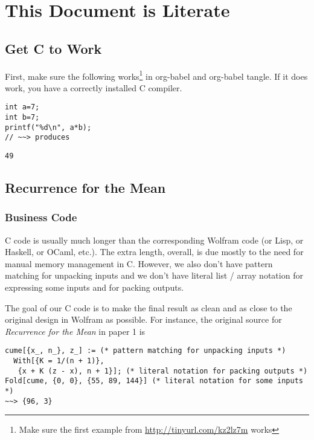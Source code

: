 \documentclass[10pt,oneside,x11names]{article}
\begin{document}
\section{This Document is Literate}
\label{sec:orgheadline15}

\subsection{Get C to Work}
\label{sec:orgheadline3}

First, make sure the following works\footnote{Make sure the first example from \url{http://tinyurl.com/kz2lz7m} works} in org-babel and org-babel tangle. If it
does work, you have a correctly installed C compiler.

\begin{verbatim}
int a=7;
int b=7;
printf("%d\n", a*b);
// ~~> produces
\end{verbatim}

\begin{verbatim}
49
\end{verbatim}

\subsection{Recurrence for the Mean}
\label{sec:orgheadline11}
\subsubsection{Business Code}
\label{sec:orgheadline4}

C code is usually much longer than the corresponding Wolfram code (or Lisp, or
Haskell, or OCaml, etc.). The extra length, overall, is due mostly to the need
for manual memory management in C. However, we also don't have pattern matching
for unpacking inputs and we don't have literal list / array notation for
expressing some inputs and for packing outputs.

The goal of our C code is to make the final result as clean and as close to the
original design in Wolfram as possible. For instance, the original source for
\emph{Recurrence for the Mean} in paper 1\footnotemark[1]{} is

\begin{verbatim}
cume[{x_, n_}, z_] := (* pattern matching for unpacking inputs *)
  With[{K = 1/(n + 1)},
   {x + K (z - x), n + 1}]; (* literal notation for packing outputs *)
Fold[cume, {0, 0}, {55, 89, 144}] (* literal notation for some inputs *)
~~> {96, 3}
\end{verbatim}
\end{document}
